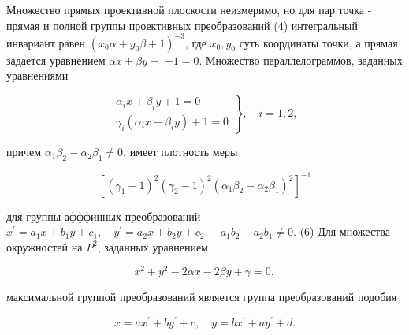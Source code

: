 \documentclass[10pt]{article}
\begin{document}
Множество прямых проективной плоскости неизмеримо, но для пар точка - прямая и полной группы проективных преобразований (4) интегральный инвариант равен $\left(x_{0} \alpha+y_{0} \beta+1\right)^{-3}$, где $x_{0}, y_{0}$ суть координаты точки, а прямая задается уравнением $\alpha x+\beta y+$ $+1=0$. Множество параллелограммов, заданных уравнениями



\[

\left.\begin{array}{l}

\alpha_{i} x+\beta_{i} y+1=0 \\

\gamma_{i}\left(\alpha_{i} x+\beta_{i} y\right)+1=0

\end{array}\right\}, \quad i=1,2,

\]



причем $\alpha_{1} \beta_{2}-\alpha_{2} \beta_{1} \neq 0$, имеет плотность меры



\[

\left[\left(\gamma_{1}-1\right)^{2}\left(\gamma_{2}-1\right)^{2}\left(\alpha_{1} \beta_{2}-\alpha_{2} \beta_{1}\right)^{2}\right]^{-1}

\]



для группы афффинных преобразований $x^{\prime}=a_{1} x+b_{1} y+c_{1}, \quad y^{\prime}=a_{2} x+b_{2} y+c_{2}, \quad a_{1} b_{2}-a_{2} b_{1} \neq 0$. (6) Для множества окружностей на $P^{2}$, заданных уравнением



\[

x^{2}+y^{2}-2 \alpha x-2 \beta y+\gamma=0,

\]



максимальной группой преобразований является группа преобразований подобия



\[

x=a x^{\prime}+b y^{\prime}+c, \quad y=b x^{\prime}+a y^{\prime}+d .

\]
\end{document}
